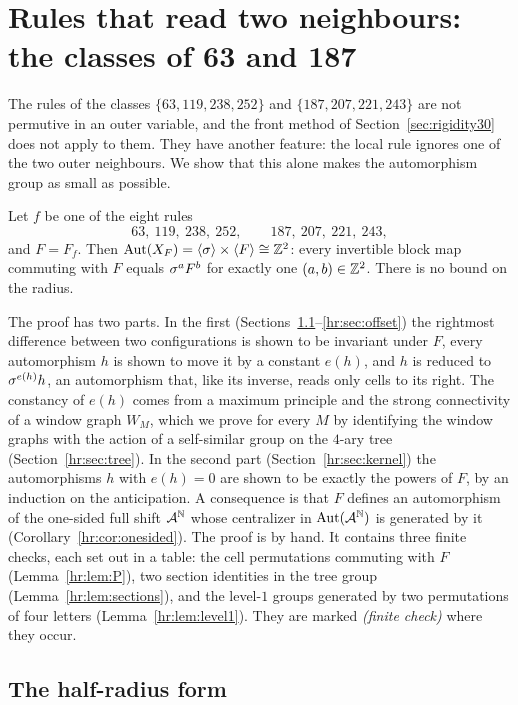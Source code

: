 \section{Rules that read two neighbours: the classes of 63 and 187}\label{sec:halfradius}

The rules of the classes $\{63,119,238,252\}$ and $\{187,207,221,243\}$ are not permutive in an outer variable, and the front method of Section~\ref{sec:rigidity30} does not apply to them. They have another feature: the local rule ignores one of the two outer neighbours. We show that this alone makes the automorphism group as small as possible.

\begin{theorem}\label{hr:thm:main}
Let $f$ be one of the eight rules
\[
63,\ 119,\ 238,\ 252,\qquad 187,\ 207,\ 221,\ 243,
\]
and $F=F_f$. Then $\operatorname{Aut}(X_F)=\langle\sigma\rangle\times\langle F\rangle\cong\mathbb{Z}^2$: every invertible block map commuting with $F$ equals $\sigma^aF^b$ for exactly one $(a,b)\in\mathbb{Z}^2$. There is no bound on the radius.
\end{theorem}

The proof has two parts. In the first (Sections~\ref{hr:sec:setting}--\ref{hr:sec:offset}) the rightmost difference between two configurations is shown to be invariant under $F$, every automorphism $h$ is shown to move it by a constant $e(h)$, and $h$ is reduced to $\sigma^{e(h)}h$, an automorphism that, like its inverse, reads only cells to its right. The constancy of $e(h)$ comes from a maximum principle and the strong connectivity of a window graph $W_M$, which we prove for every $M$ by identifying the window graphs with the action of a self-similar group on the $4$-ary tree (Section~\ref{hr:sec:tree}). In the second part (Section~\ref{hr:sec:kernel}) the automorphisms $h$ with $e(h)=0$ are shown to be exactly the powers of $F$, by an induction on the anticipation. A consequence is that $F$ defines an automorphism of the one-sided full shift $\mathcal{A}^{\mathbb N}$ whose centralizer in $\operatorname{Aut}(\mathcal{A}^{\mathbb N})$ is generated by it (Corollary~\ref{hr:cor:onesided}). The proof is by hand. It contains three finite checks, each set out in a table: the cell permutations commuting with $F$ (Lemma~\ref{hr:lem:P}), two section identities in the tree group (Lemma~\ref{hr:lem:sections}), and the level-$1$ groups generated by two permutations of four letters (Lemma~\ref{hr:lem:level1}). They are marked \emph{(finite check)} where they occur.

\subsection{The half-radius form}\label{hr:sec:setting}

